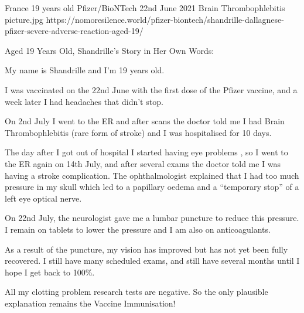 {France}
{19 years old}
{Pfizer/BioNTech}
{22nd June 2021}
{Brain Thrombophlebitis}
{picture.jpg}
{https://nomoresilence.world/pfizer-biontech/shandrille-dallagnese-pfizer-severe-adverse-reaction-aged-19/}
{

Aged 19 Years Old, Shandrille’s Story in Her Own Words:

My name is Shandrille and I’m 19 years old.

I was vaccinated on the 22nd June with the first dose of the Pfizer vaccine, and
a week later I had headaches that didn’t stop.

On 2nd July I went to the ER and after scans the doctor told me I had Brain
Thrombophlebitis (rare form of stroke) and I was hospitalised for 10 days.

The day after I got out of hospital I started having eye problems , so I went to
the ER again on 14th July, and after several exams the doctor told me I was
having a stroke complication. The ophthalmologist explained that I had too much
pressure in my skull which led to a papillary oedema and a ``temporary stop'' of
a left eye optical nerve.

On 22nd July, the neurologist gave me a lumbar puncture to reduce this
pressure. I remain on tablets to lower the pressure and I am also on
anticoagulants.

As a result of the puncture, my vision has improved but has not yet been fully
recovered. I still have many scheduled exams, and still have several months
until I hope I get back to 100\%.

All my clotting problem research tests are negative. So the only plausible
explanation remains the Vaccine Immunisation!

}
